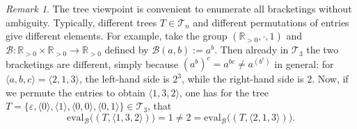 \documentclass[11pt, a4paper, oneside]{article}
\theoremstyle{remark}
\newtheorem*{remark}{Remark}
\theoremstyle{lemma}
\begin{document}
\begin{remark}
The tree viewpoint is convenient to enumerate all bracketings without ambiguity. 
Typically, different trees \(T \in \mathcal{T}_n\) and different permutations of entries 
give different elements. For example, take the group \((\mathbb{R}_{>0},\cdot,1)\) and 
\(\mathcal{B} : \mathbb{R}_{>0}\times \mathbb{R}_{>0} \rightarrow \mathbb{R}_{>0}\) 
defined by \(\mathcal{B}\!\left(a,b\right):=a^b\). 
Then already in \(\mathcal{T}_3\) the two bracketings are different, simply because 
\((a^b)^c = a^{bc} \neq a^{(b^c)}\) in general: for \(\langle a,b,c\rangle = \langle 2,1,3\rangle\), the left-hand side is \(2^3\), while the right-hand side is \(2\). Now, if we permute the entries to obtain \(\langle 1,3,2\rangle\), one has for the tree \(T = \{\varepsilon, \langle 0\rangle, \langle 1\rangle, \langle 0,0\rangle, \langle 0,1\rangle\} \in \mathcal{T}_3\), that 
\[
\mathrm{eval}_{\mathcal{B}}\bigl((T, \langle 1,3,2\rangle)\bigr) = 1 \neq 2 = 
\mathrm{eval}_{\mathcal{B}}\bigl((T, \langle 2,1,3\rangle)\bigr).
\]
\end{remark}
\printbibliography
\end{document}
